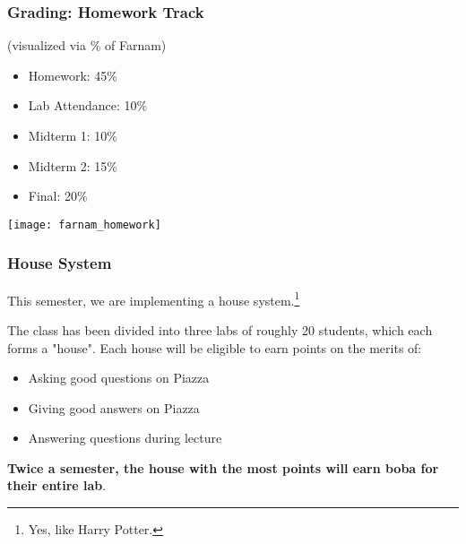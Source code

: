\documentclass[aspectratio=169, handout]{beamer}
\begin{document}
\begin{frame}[fragile]
  \frametitle{Grading: Homework Track}

  \begin{minipage}{0.59\textwidth}

    (visualized via \% of Farnam) \\

    \vspace{\fill}

    \begin{itemize}
      \item Homework: 45\%
      \item Lab Attendance: 10\%
      \item Midterm 1: 10\%
      \item Midterm 2: 15\%
      \item Final: 20\%
    \end{itemize}
  \end{minipage}
  \begin{minipage}{0.4\textwidth}
    \texttt{[image: farnam\_homework]}
  \end{minipage}
\end{frame}



\begin{frame}[fragile]
  \frametitle{House System}

  This semester, we are implementing a house system.\footnote{Yes, like Harry Potter.}

  \pause
  \vspace{\fill}

  The class has been divided into three labs of roughly 20 students, which each forms a
  "house". Each house will be eligible to earn points on the merits of:
  \pause
  \begin{itemize}
    \item Asking good questions on Piazza \pause
    \item Giving good answers on Piazza \pause
    \item Answering questions during lecture
  \end{itemize}

  \pause
  \vspace{\fill}

  \textbf{Twice a semester, the house with the most points will earn boba for their entire lab}.
\end{frame}
\end{document}
